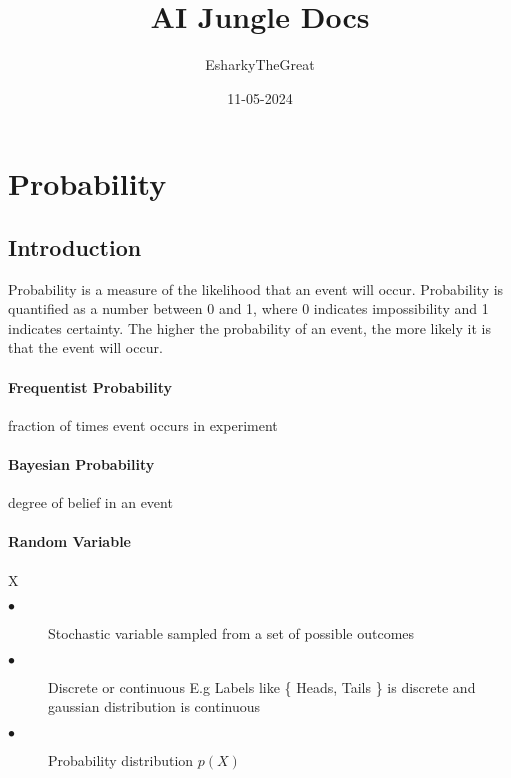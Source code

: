 \documentclass{article}
\title{AI Jungle Docs}
\date{11-05-2024}
\author{EsharkyTheGreat}
\begin{document}
\maketitle
\newpage
\tableofcontents
\newpage
{}

\section{Probability}
\subsection{Introduction}
Probability is a measure of the likelihood that an event will occur. Probability is quantified as a number between 0 and 1, where 0 indicates impossibility and 1 indicates certainty. The higher the probability of an event, the more likely it is that the event will occur.

\paragraph{Frequentist Probability} fraction of times event occurs in experiment
\paragraph{Bayesian Probability} degree of belief in an event

\paragraph{Random Variable} X
\begin{description}
    \item[$\bullet$]Stochastic variable sampled from a set of possible
          outcomes
    \item [$\bullet$] Discrete or continuous E.g Labels like \{ Heads, Tails \} is discrete and gaussian distribution is continuous
    \item [$\bullet$] Probability distribution $ p(X) $
\end{description}
\end{document}
